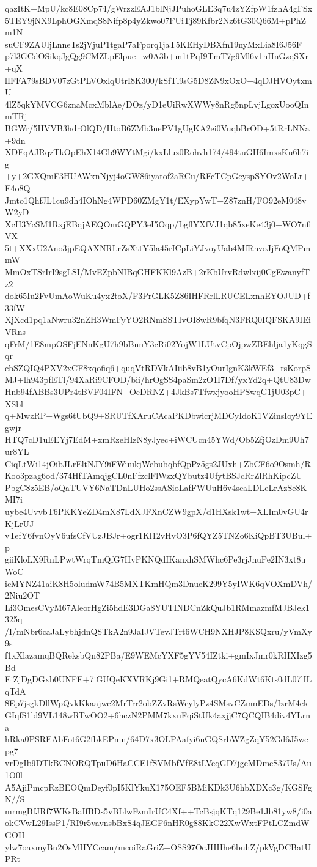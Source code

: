 qazItK+MpU/kc8E08Cp74/gWrzzEAJ1blNjJPuhoGLE3q7u4zYZfpW1fzhA4gFSx
5TEY9jNX9LphOGXmqS8Nifp8p4yZkwo07FUiTj89Kfbr2Nz6tG30Q66M+pPhZm1N
suCF9ZAUljLnneTs2jVjuP1tgaP7aFporq1jaT5KEHyDBXfn19nyMxLia8I6J56F
p7l3GCdOSikqJgQg9CMZLpElpue+w0A3b+m1tPqI9TmT7g9Ml6v1nHnGzqSXr+qX
lIFFA79sBDV07zGtPLVOxlqUtrI8K300/kSfTl9sG5D8ZN9xOxO+4qDJHVOytxmU
4lZ5qkYMVCG6znaMcxMblAe/DOz/yD1eUiRwXWWy8nRg5npLvjLgoxUooQInmTRj
BGWr/5IIVVB3hdrOlQD/HtoB6ZMb3nePV1gUgKA2ei0VuqbBrOD+5tRrLNNa+9dn
XDFqAJRqzTkOpEhX14Gb9WYtMgi/kxLluz0Rohvh174/494tuGII6ImxsKu6h7ig
+y+2GXQmF3HUAWxnNjyj4oGW86iyatof2aRCu/RFcTCpGcyspSYOv2WoLr+E4o8Q
Jmto1QhfJL1cu9dh4IOhNg4WPD60ZMgY1t/EXypYwT+Z87znH/FO92eM048vW2yD
XcH3YcSM1RxjEBqjAEQOmGQPY3eI5Oqp/LgflYXfVJ1qb85xeKe43j0+WO7nfiVX
5t+XXxU2Ano3jpEQAXNRLrZsXttY5la45rICpLiYJvoyUab4MfRnvoJjFoQMPmmW
MmOxTSrIrI9sgLSI/MvEZpbNIBqGHFKKl9AzB+2rKbUrvRdwlxij0CgEwanyfTz2
dok65Iu2FvUmAoWuKu4yx2toX/F3PrGLK5Z86IHFRrlLRUCELxnhEYOJUD+f33fW
XjXcd1pq1aNwru32nZH3WmFyYO2RNmSSTIvOI8wR9bfqN3FRQ0IQFSKA9IEiVRns
qFrM/1E8mpOSFjENnKgU7h9bBnnY3cRi02YojW1LUtvCpOjpwZBEhlja1yKqgSqr
cbSZQIQ4PXV2xCF8xqofiq6+quqVtRDVkAIiib8vB1yOurIgnK3kWEf3+rsKorpS
MJ+lh943pfETl/94XaRi9CFOD/bii/hrOgSS4paSm2zO1I7Df/yxYd2q+QtU83Dw
Hnb94fABBs3UPr4tBVF04IFN+OcDRNZ+4JkBs7TfwxjyooHPSwqG1jU03pC+XSbl
q+MwzRP+Wgs6tUbQ9+SRUTfXAruCAcaPKDbwicrjMDCyIdoK1VZinsIoy9YEgwjr
HTQ7cD1uEEYj7EdM+xmRzeHIzN8yJyec+iWCUcn45YWd/Ob5ZfjOzDm9Uh7ur8YL
CiqLtWi14jOibJLrEltNJY9iFWuukjWebubqbfQpPz5gs2JUxh+ZbCF6o9Osmh/R
Koo3pzag6od/374HfTAmqjgCL0nFfzclFlWzxQYbutz4UfytBSJcRrZlRhKipcZU
PbgC8z5EB/oQaTUVY6NaTDnLUHo2ssASioLafFWUuH6v4scaLDLeLrAzSe8KMI7i
uybe4UvvbT6PKKYeZD4mX87LdXJFXnCZW9gpX/d1HXsk1wt+XLIm0vGU4rKjLrUJ
vTefY6fvnOyV6ufsCfVUzJBJr+ogr1Kl12vHvO3P6fQYZ5TNZo6KiQpBT3UBul+p
giiKloLX9RnLPwtWrqTmQfG7HvPKNQdIKanxhSMWhc6Pe3rjJnuPe2IN3xt8uWoC
icMYNZ41aiK8H5oludmW74B5MXTKmHQm3DnueK299Y5yIWK6qVOXmDVh/2Niu2OT
Li3OmesCVyM67AleorHgZi5hdE3DGa8YUTINDCnZkQuJb1RMmazmfMJBJek1325q
/I/mNbr6caJaLybhjdnQSTkA2n9JaIJVTevJTrt6WCH9NXHJP8KSQxru/yVmXy9s
f1xXlazamqBQReksbQn82PBa/E9WEMcYXF5gYV54IZtki+gmIxJmr0kRHXIzg5Bd
EiZjDgDGxb0UNFE+7iGUQeKXVRKj9Gi1+RMQeatQycA6KdWt6Kts0dL07lILqTdA
8Ep7jsgkDllWpQvkKkaajwc2MrTrr2obZZvRsWcylyPz4SMsvCZmnEDs/IzrM4ek
GIqfS1ld9VL148wRTwOO2+6hczN2PMM7kxuFqiStUk4axjjC7QCQIB4div4YLrna
hRka0PSREAbFot6G2fbkEPmn/64D7x3OLPAafyi6uGQSrbWZgZqY52Gd6J5wepg7
vrDgIb9DTkBCNORQTpuD6HaCCE1fSVMbfVfE8tLVeqGD7jgeMDmcS37Us/Au1O0l
A5AjiPmcpRzBEOQmDeyf0pI5KlYkuX175OEF5BMiKDk3U6hbXDXc3g/KGSFgN//S
mrmgBfJRf7WKsBaIfBDs5vBLlwFzmIrUC4Xf++TcBsjqKTq129Be1Jb81yw8/i0a
okCVwL29IssP1/RI9r5vavnsbBxS4qJEGF6nHR0g88KkC22XwWxtFPtLCZmdWGOH
ylw7oaxmyBn2OsMHYCcam/mcoiRaGriZ+OSS97OcJHHhe6buhZ/pkVgDCBatUPRt
